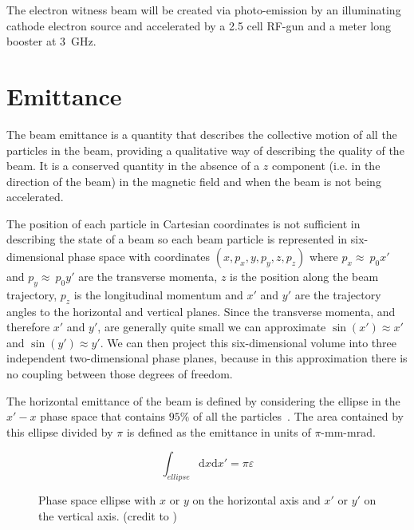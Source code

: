 \documentclass[a4paper]{report}
\begin{document}
The electron witness beam will be created via photo-emission by an illuminating
cathode electron source and accelerated by a 2.5 cell RF-gun and a meter long
booster at \SI{3}{\giga\hertz}.


\section{Emittance}

The beam emittance is a quantity that describes the collective motion of all
the particles in the beam, providing a qualitative way of describing the
quality of the beam. It is a conserved quantity in the absence of a \(z\)
component (i.e. in the direction of the beam) in the magnetic field and when
the beam is not being accelerated.

The position of each particle in Cartesian coordinates is not sufficient in
describing the state of a beam so each beam particle is represented in
six-dimensional phase space with coordinates \(\left(x,p_x,y,p_y,z,p_z\right)\)
where \(p_x\approx~p_0x'\) and \(p_y\approx~p_0y'\) are the transverse momenta,
\(z\) is the position along the beam trajectory, \(p_z\) is the longitudinal
momentum and \(x'\) and \(y'\) are the trajectory angles to the horizontal and
vertical planes. Since the transverse momenta, and therefore \(x'\) and \(y'\),
are generally quite small we can approximate \(\sin\left(x'\right)\approx x'\)
and \(\sin\left(y'\right)\approx y'\). We can then project this six-dimensional
volume into three independent two-dimensional phase planes, because in this
approximation there is no coupling between those degrees of freedom.

The horizontal emittance of the beam is defined by considering the ellipse in
the \(x'-x\) phase space that contains \(95\%\) of all the
particles~\cite{buon1994beam}. The area contained by this ellipse divided by
\(\pi\) is defined as the emittance in units of \(\pi\)-mm-mrad.

\[ \int_{ellipse}\mathrm{d}x\mathrm{d}x' =\pi\varepsilon \]

\begin{figure}[!t]
	\centering
	\caption{Phase space ellipse with \(x\) or \(y\) on the horizontal axis
		and \(x'\) or \(y'\) on the vertical axis. (credit to
		\cite{wiedemann2007particle})}
	\label{fig:phase_space}
\end{figure}
\end{document}
